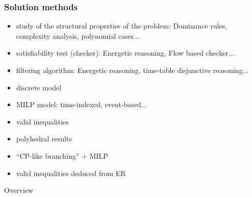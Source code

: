  \begin{frame}
   \frametitle{Solution methods}
   \vfill
   \begin{description}[Properties]
   \item[Properties] {\small
       \begin{itemize}
       \item study of the structural properties of the problem:
         {\footnotesize Dominance rules, complexity analysis, polynomial cases...}
       \end{itemize}}
     \vfill
\pause
   \item[CP] {\small
       \begin{itemize}
       \item satisfiability test (checker): {\footnotesize Energetic
           reasoning, Flow based checker...}
       \item filtering algorithm: {\footnotesize Energetic reasoning, time-table
           disjunctive reasoning...}
       \item discrete model
       \end{itemize}}
     \vfill
\pause
   \item[MILP] {\small
       \begin{itemize}
       \item MILP model: {\footnotesize time-indexed, event-based...}
       \item valid inequalities
       \item polyhedral results
       \end{itemize}}
     \vfill
\pause
   \item[Hybrid] {\small
       \begin{itemize}
       \item ``CP-like branching'' + MILP 
       \item valid inequalities deduced from ER
       \end{itemize}}
   \end{description}
 \end{frame}

 \setcounter{tocdepth}{20}
 \begin{frame}{Overview}
   \tableofcontents[hideothersubsections,subsubsectionstyle={show/show/show/show}]
 \end{frame}
